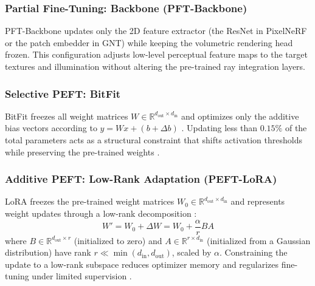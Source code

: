 \subsubsection{Partial Fine-Tuning: Backbone (PFT-Backbone)}
PFT-Backbone updates only the 2D feature extractor (the ResNet in PixelNeRF or the patch embedder in GNT) while keeping the volumetric rendering head frozen. This configuration adjusts low-level perceptual feature maps to the target textures and illumination without altering the pre-trained ray integration layers.

\subsubsection{Selective PEFT: BitFit}
BitFit freezes all weight matrices $W \in \mathbb{R}^{d_{\text{out}} \times d_{\text{in}}}$ and optimizes only the additive bias vectors according to $y = W x + (b + \Delta b)$ \cite{zaken2022bitfit}. Updating less than $0.15\%$ of the total parameters acts as a structural constraint that shifts activation thresholds while preserving the pre-trained weights \cite{gupta2024beyondlora}.

\subsubsection{Additive PEFT: Low-Rank Adaptation (PEFT-LoRA)}
LoRA freezes the pre-trained weight matrices $W_0 \in \mathbb{R}^{d_{\text{out}} \times d_{\text{in}}}$ and represents weight updates through a low-rank decomposition \cite{hu2021lora}:
\begin{equation}
W' = W_0 + \Delta W = W_0 + \frac{\alpha}{r} B A
\label{eq:lora}
\end{equation}
where $B \in \mathbb{R}^{d_{\text{out}} \times r}$ (initialized to zero) and $A \in \mathbb{R}^{r \times d_{\text{in}}}$ (initialized from a Gaussian distribution) have rank $r \ll \min(d_{\text{in}}, d_{\text{out}})$, scaled by $\alpha$. Constraining the update to a low-rank subspace reduces optimizer memory and regularizes fine-tuning under limited supervision \cite{gupta2024beyondlora}.
